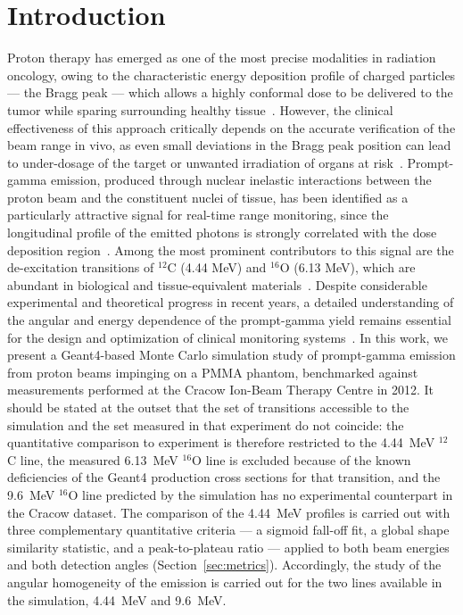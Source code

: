 \documentclass[a4paper]{article}
\begin{document}
\vspace{6pt}

\section{Introduction}

Proton therapy has emerged as one of the most precise modalities in radiation oncology, owing to the characteristic energy deposition profile of charged particles — the Bragg peak — which allows a highly conformal dose to be delivered to the tumor while sparing surrounding healthy tissue~\cite{knopf2013}. However, the clinical effectiveness of this approach critically depends on the accurate verification of the beam range in vivo, as even small deviations in the Bragg peak position can lead to under-dosage of the target or unwanted irradiation of organs at risk~\cite{paganetti2012,knopf2013}. Prompt-gamma emission, produced through nuclear inelastic interactions between the proton beam and the constituent nuclei of tissue, has been identified as a particularly attractive signal for real-time range monitoring, since the longitudinal profile of the emitted photons is strongly correlated with the dose deposition region~\cite{krimmer2018,parodipolf2018}. Among the most prominent contributors to this signal are the de-excitation transitions of $^{12}$C (4.44 MeV) and $^{16}$O (6.13 MeV), which are abundant in biological and tissue-equivalent materials~\cite{verburg2014}. Despite considerable experimental and theoretical progress in recent years, a detailed understanding of the angular and energy dependence of the prompt-gamma yield remains essential for the design and optimization of clinical monitoring systems~\cite{krimmer2018}. In this work, we present a Geant4-based Monte Carlo simulation study of prompt-gamma emission from proton beams impinging on a PMMA phantom, benchmarked against measurements performed at the Cracow Ion-Beam Therapy Centre in 2012. It should be stated at the outset that the set of transitions accessible to the simulation and the set measured in that experiment do not coincide: the quantitative comparison to experiment is therefore restricted to the 4.44~MeV $^{12}$C line, the measured 6.13~MeV $^{16}$O line is excluded because of the known deficiencies of the Geant4 production cross sections for that transition, and the 9.6~MeV $^{16}$O line predicted by the simulation has no experimental counterpart in the Cracow dataset. The comparison of the 4.44~MeV profiles is carried out with three complementary quantitative criteria — a sigmoid fall-off fit, a global shape similarity statistic, and a peak-to-plateau ratio — applied to both beam energies and both detection angles (Section~\ref{sec:metrics}). Accordingly, the study of the angular homogeneity of the emission is carried out for the two lines available in the simulation, 4.44~MeV and 9.6~MeV.
\end{document}
